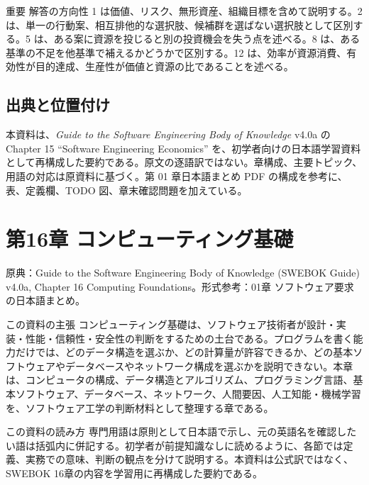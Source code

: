 \documentclass[a4paper,11pt]{ltjsarticle}
\numberwithin{figure}{section}
\numberwithin{table}{section}
\begin{document}
\begin{pointbox}{重要}
解答の方向性 1 は価値、リスク、無形資産、組織目標を含めて説明する。2 は、単一の行動案、相互排他的な選択肢、候補群を選ばない選択肢として区別する。5 は、ある案に資源を投じると別の投資機会を失う点を述べる。8 は、ある基準の不足を他基準で補えるかどうかで区別する。12 は、効率が資源消費、有効性が目的達成、生産性が価値と資源の比であることを述べる。
\end{pointbox}

\subsection*{出典と位置付け}

本資料は、\textit{Guide to the Software Engineering Body of Knowledge} v4.0a の Chapter 15 ``Software Engineering Economics'' を、初学者向けの日本語学習資料として再構成した要約である。原文の逐語訳ではない。章構成、主要トピック、用語の対応は原資料に基づく。第 01 章日本語まとめ PDF の構成を参考に、表、定義欄、TODO 図、章末確認問題を加えている。

\section{第16章 コンピューティング基礎}
原典：Guide to the Software Engineering Body of Knowledge (SWEBOK Guide) v4.0a, Chapter 16 Computing Foundations。形式参考：01章 ソフトウェア要求の日本語まとめ。

\begin{pointbox}{この資料の主張}
コンピューティング基礎は、ソフトウェア技術者が設計・実装・性能・信頼性・安全性の判断をするための土台である。プログラムを書く能力だけでは、どのデータ構造を選ぶか、どの計算量が許容できるか、どの基本ソフトウェアやデータベースやネットワーク構成を選ぶかを説明できない。本章は、コンピュータの構成、データ構造とアルゴリズム、プログラミング言語、基本ソフトウェア、データベース、ネットワーク、人間要因、人工知能・機械学習を、ソフトウェア工学の判断材料として整理する章である。

\end{pointbox}

\begin{pointbox}{この資料の読み方}
専門用語は原則として日本語で示し、元の英語名を確認したい語は括弧内に併記する。初学者が前提知識なしに読めるように、各節では定義、実務での意味、判断の観点を分けて説明する。本資料は公式訳ではなく、SWEBOK 16章の内容を学習用に再構成した要約である。

\end{pointbox}
\end{document}
